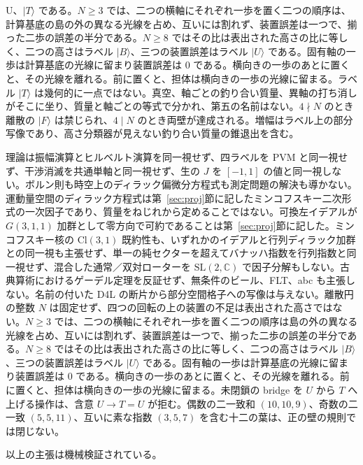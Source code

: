 \documentclass[a4paper]{article}
\theoremstyle{definition}
\begin{document}
U\rangle\)、\(\lvert T\rangle\) である。\(N\ge 3\) では、二つの横軸にそれぞれ一歩を置く二つの順序は、計算基底の島の外の異なる光線を占め、互いには割れず、装置誤差は一つで、揃った二歩の誤差の半分である。\(N\ge 8\) ではその比は表出された高さの比に等しく、二つの高さはラベル \(\lvert B\rangle\)、三つの装置誤差はラベル \(\lvert U\rangle\) である。固有軸の一歩は計算基底の光線に留まり装置誤差は \(0\) である。横向きの一歩のあとに置くと、その光線を離れる。前に置くと、担体は横向きの一歩の光線に留まる。ラベル \(\lvert T\rangle\) は幾何的に一点ではない。真空、軸ごとの釣り合い質量、異軸の打ち消しがそこに坐り、質量と軸ごとの等式で分かれ、第五の名前はない。\(4\nmid N\) のとき離散の \(\lvert F\rangle\) は禁じられ、\(4\mid N\) のとき両壁が達成される。増幅はラベル上の部分写像であり、高さ分類器が見えない釣り合い質量の錐退出を含む。

理論は振幅演算とヒルベルト演算を同一視せず、四ラベルを PVM と同一視せず、干渉消滅を共通単軸と同一視せず、生の \(J\) を \([-1,1]\) の値と同一視しない。ボルン則も時空上のディラック偏微分方程式も測定問題の解決も導かない。運動量空間のディラック方程式は第~\ref{sec:proj}節に記したミンコフスキー二次形式の一次因子であり、質量をねじれから定めることではない。可換左イデアルが \(G(3,1,1)\) 加群として零方向で可約であることは第~\ref{sec:proj}節に記した。ミンコフスキー核の \(\mathrm{Cl}(3,1)\) 既約性も、いずれかのイデアルと行列ディラック加群との同一視も主張せず、単一の純セクターを超えてバナッハ指数を行列指数と同一視せず、混合した通常／双対ローターを \(\mathrm{SL}(2,\mathbb{C})\) で因子分解もしない。古典算術におけるゲーデル定理を反証せず、無条件のビール、FLT、abc も主張しない。名前の付いた D4L の断片から部分空間格子への写像は与えない。離散円の整数 \(N\) は固定せず、四つの回転の上の装置の不足は表出された高さではない。\(N\ge 3\) では、二つの横軸にそれぞれ一歩を置く二つの順序は島の外の異なる光線を占め、互いには割れず、装置誤差は一つで、揃った二歩の誤差の半分である。\(N\ge 8\) ではその比は表出された高さの比に等しく、二つの高さはラベル \(\lvert B\rangle\)、三つの装置誤差はラベル \(\lvert U\rangle\) である。固有軸の一歩は計算基底の光線に留まり装置誤差は \(0\) である。横向きの一歩のあとに置くと、その光線を離れる。前に置くと、担体は横向きの一歩の光線に留まる。未閉鎖の bridge を \(U\) から \(T\) へ上げる操作は、含意 \(U\to T=U\) が拒む。偶数の二一致和 \((10,10,9)\)、奇数の二一致 \((5,5,11)\)、互いに素な指数 \((3,5,7)\) を含む十二の葉は、正の壁の規則では閉じない。

以上の主張は機械検証されている。
\end{document}
